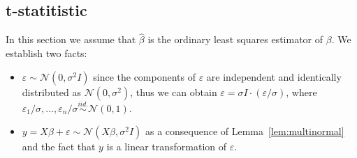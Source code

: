 \subsection{t-statitistic}
In this section we assume that $\hat{\beta}$ is the ordinary least squares estimator of $\beta$. We establish two facts:
\begin{itemize}                                        
    \item $\varepsilon \sim \mathcal{N}(0, \sigma^2 I)$ since the components of $\varepsilon$ are independent and identically distributed as $\mathcal{N}(0, \sigma^2)$, thus we can obtain $\varepsilon = \sigma I \cdot (\varepsilon / \sigma)$, where $\varepsilon_1 / \sigma, ..., \varepsilon_n / \sigma \overset{iid.}{\sim} \mathcal{N}(0, 1)$.
    \item $y = X\beta + \varepsilon \sim \mathcal{N}(X\beta, \sigma^2 I)$ as a consequence of Lemma~\ref{lem:multinormal} and the fact that $y$ is a linear transformation of $\varepsilon$.
\end{itemize}

